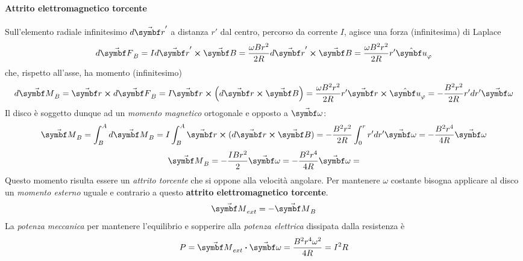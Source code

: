 \paragraph{Attrito elettromagnetico torcente}
Sull'elemento radiale infinitesimo $d\vba{r}'$ a distanza $r'$ dal centro, percorso da corrente $I$, agisce una forza (infinitesima) di Laplace
\begin{equation*}
	d\vba{F}_B=I d\vba{r}'\cross \vba{B}=\frac{\omega B r^2}{2R}d\vba{r}'\cross \vba{B}=\frac{\omega B^2 r^2}{2R} r'\vbh{u}_{\phi}
\end{equation*}
che, rispetto all'asse, ha momento (infinitesimo)
\begin{equation*}
	d\vba{M}_B=\vba{r}\cross d\vba{F}_B=I\vba{r}\cross\left(d\vba{r}\cross \vba{B}\right)=\frac{\omega B^2 r^2}{2R}r'\vba{r}\cross\vbh{u}_{\phi}=-\frac{B^2r^2}{2R}r'dr'\vba{\omega}
\end{equation*}
Il disco è soggetto dunque ad un \textit{momento magnetico} ortogonale e opposto a $\vba{\omega}$:
\begin{equation*}
	\vba{M}_B=\int_{B}^{A}d\vba{M}_B=I\int_{B}^{A}\vba{r}\cross(d\vba{r}\cross\vba{B})=-\frac{B^2r^2}{2R}\int_{0}^{r}r'dr'\vba{\omega}=-\frac{B^2r^4}{4R}\vba{\omega}
\end{equation*}
\begin{equation}
	\vba{M}_B=-\frac{IBr^2}{2}\vba{\omega}=-\frac{B^2r^4}{4R}\vba{\omega}=
\end{equation}
Questo momento risulta essere un \textit{attrito torcente} che si oppone alla velocità angolare. Per mantenere $\omega$ costante bisogna applicare al disco un \textit{momento esterno} uguale e contrario a questo \textbf{attrito elettromagnetico torcente}.
\begin{equation*}
	\vba{M}_{ext}=-\vba{M}_B
\end{equation*}
La \textit{potenza meccanica} per mantenere l'equilibrio e sopperire alla \textit{potenza elettrica} dissipata dalla resistenza è
\begin{equation}
	P=\vba{M}_{ext}\vdot\vba{\omega}=\frac{B^2r^4\omega^2}{4R}=I^2R
\end{equation}
